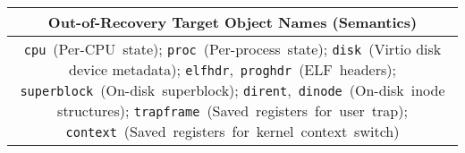 \begin{table*}[ht]
{\begin{tabular}{|c||c|c|c|c|}
      \hline \hline
      \multicolumn{5}{|c|}{Out-of-Recovery Target Object Names (Semantics)}\\
      \hline \hline
      \multicolumn{5}{|p{20cm}|}{ \texttt{cpu}~(Per-CPU~state); \texttt{proc}~(Per-process~state); \texttt{disk}~(Virtio disk device metadata); \texttt{elfhdr},~\texttt{proghdr}~(ELF~headers); \texttt{superblock}~(On-disk~superblock); \texttt{dirent},~\texttt{dinode}~(On-disk~inode structures); \texttt{trapframe}~(Saved~registers~for~user~trap); \texttt{context}~(Saved~registers~for~kernel~context~switch)}\\




\end{tabular}}
\end{table*}
